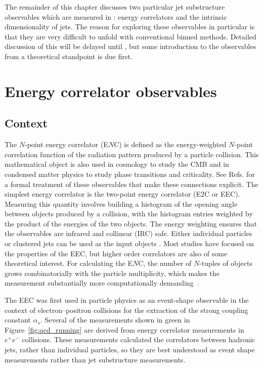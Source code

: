 The remainder of this chapter discusses two particular jet substructure observables which are measured in : energy correlators and the intrinsic dimensionality of jets.
The reason for exploring these observables in particular is that they are very difficult to unfold with conventional binned methods.
Detailed discussion of this will be delayed until , but some introduction to the observables from a theoretical standpoint is due first.

\section{Energy correlator observables}
\label{sec:eec}

\subsection{Context}

The $N$-point energy correlator (E$N$C) is defined as the energy-weighted $N$-point correlation function of the radiation pattern produced by a particle collision.
This mathematical object is also used in cosmology to study the CMB and in condensed matter physics to study phase transitions and criticality.
See Refs. \cite{Hofman:2008ar, Kologlu:2019mfz} for a formal treatment of these observables that make these connections explicit.
The simplest energy correlator is the two-point energy correlator (E2C or EEC).
Measuring this quantity involves building a histogram of the opening angle between objects produced by a collision, with the histogram entries weighted by the product of the energies of the two objects.
The energy weighting ensures that the observables are infrared and collinear (IRC) safe.
Either individual particles or clustered jets can be used as the input objects \cite{ATLAS:2015yaa, ATLAS:2017qir, ATLAS:2023tgo, CMS:2024mlf}.
Most studies have focused on the properties of the EEC, but higher order correlators are also of some theoretical interest.
For calculating the E$N$C, the number of $N$-tuples of objects grows combinatorially with the particle multiplicity, which makes the measurement substantially more computationally demanding~\cite{Alipour-fard:2024szj}.

The EEC was first used in particle physics as an event-shape observable in the context of electron--positron collisions \cite{Basham:1977iq, Basham:1978bw, OPAL:1991uui, SLD:1994idb} for the extraction of the strong coupling constant $\alpha_s$.
Several of the measurements shown in green in Figure~\ref{fig:qcd_running} are derived from energy correlator measurements in $e^+e^-$ collisions.
These measurements calculated the correlators between hadronic jets, rather than individual particles, so they are best understood as event shape measurements rather than jet substructure measurements.

